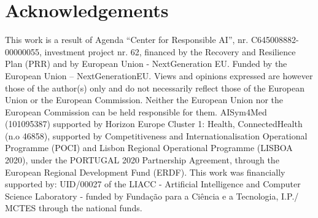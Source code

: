 \documentclass[runningheads]{llncs}
\begin{document}
\section*{Acknowledgements}
This work is a result of Agenda “Center for Responsible AI”, nr. C645008882-00000055, investment project nr. 62, financed by the Recovery and Resilience Plan (PRR) and by European Union -  NextGeneration EU. Funded by the European Union – NextGenerationEU. Views and opinions expressed are however those of the author(s) only and do not necessarily reflect those of the European Union or the European Commission. Neither the European Union nor the European Commission can be held responsible for them.
AISym4Med (101095387) supported by Horizon Europe Cluster 1: Health, ConnectedHealth (n.o 46858), supported by Competitiveness and Internationalisation Operational Programme (POCI) and Lisbon Regional Operational Programme (LISBOA 2020), under the PORTUGAL 2020 Partnership Agreement, through the European Regional Development Fund (ERDF).
This work was financially supported by: UID/00027 of the LIACC - Artificial Intelligence and Computer Science Laboratory - funded by Fundação para a Ciência e a Tecnologia, I.P./ MCTES through the national funds.




\end{document}

